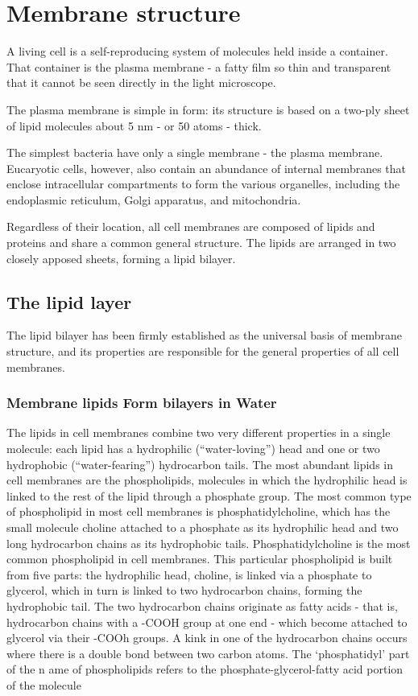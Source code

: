 \chapter{Membrane structure}

A living cell is a self-reproducing system of molecules held inside a container.
That container is the plasma membrane - a fatty film so thin and
transparent that it cannot be seen directly in the light microscope.

The plasma membrane is simple in form: its structure is based on a two-ply
sheet of lipid molecules about 5 nm - or 50 atoms - thick.

The simplest bacteria have only a single membrane - the plasma membrane.
Eucaryotic cells, however, also contain an abundance of internal
membranes that enclose intracellular compartments to form the various
organelles, including the endoplasmic reticulum, Golgi apparatus, and
mitochondria.

Regardless of their location, all cell membranes are composed of lipids
and proteins and share a common general structure. The
lipids are arranged in two closely apposed sheets, forming a lipid bilayer.

\section{The lipid layer}

The lipid bilayer has been firmly established as the universal basis of
membrane structure, and its properties are responsible for the general
properties of all cell membranes.

\subsection{Membrane lipids Form bilayers in Water}

The lipids in cell membranes combine two very different properties in a
single molecule: each lipid has a hydrophilic (“water-loving”) head and
one or two hydrophobic (“water-fearing”) hydrocarbon tails.
The most abundant lipids in cell membranes are the phospholipids,
molecules in which the hydrophilic head is linked to the rest of the lipid
through a phosphate group. The most common type of phospholipid
in most cell membranes is phosphatidylcholine, which has the small
molecule choline attached to a phosphate as its hydrophilic head and two
long hydrocarbon chains as its hydrophobic tails.
Phosphatidylcholine is the most common phospholipid in cell membranes.
This particular phospholipid is built from five parts: the hydrophilic head,
choline, is linked via a phosphate to glycerol, which in turn is linked to two
hydrocarbon chains, forming the hydrophobic tail. The two hydrocarbon chains originate
as fatty acids - that is, hydrocarbon chains with a -COOH group at one end - which become
attached to glycerol via their -COOh groups. A kink in one of the hydrocarbon chains
occurs where there is a double bond between two carbon atoms. The ‘phosphatidyl’ part of the n
ame of phospholipids refers to the phosphate-glycerol-fatty acid portion of the molecule

